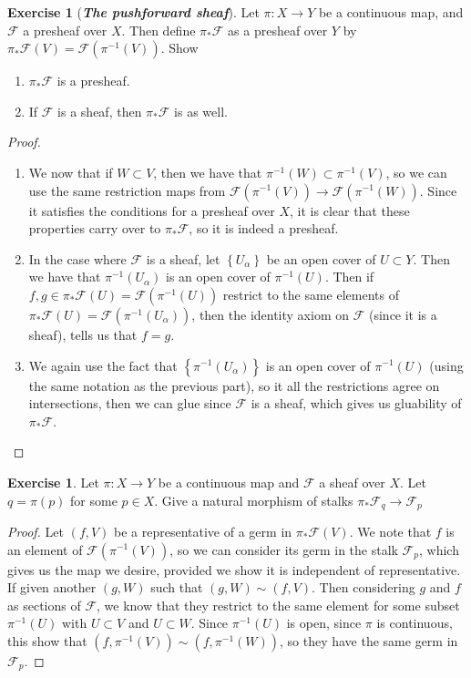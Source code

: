 \documentclass[psamsfonts]{amsart}
\theoremstyle{definition}
\newtheorem{exer}[thm]{Exercise}
\theoremstyle{remark}
\newcommand{\ib}[1]{\textbf{\textit{#1}}}
\newcommand{\inv}{^{-1}}
\newcommand{\set}[1]{\left\lbrace #1 \right\rbrace}
\newcommand{\enumbreak}{\ \\ \vspace{-\baselineskip}}
\begin{document}
%
\begin{exer}[\ib{The pushforward sheaf}]
Let $\pi : X \to Y$ be a continuous map, and $\mathscr{F}$ a presheaf over $X$. Then define $\pi_*\mathscr{F}$ as a presheaf over $Y$ by $\pi_*\mathscr{F}(V) = \mathscr{F}(\pi\inv(V))$. Show 
\begin{enumerate}
\item $\pi_*\mathscr{F}$ is a presheaf.
\item If $\mathscr{F}$ is a sheaf, then $\pi_*\mathscr{F}$ is as well.
\end{enumerate}
\end{exer}
%
\begin{proof} \enumbreak
\begin{enumerate}
\item We now that if $W \subset V$, then we have that $\pi\inv(W) \subset \pi\inv(V)$, so we can use the same restriction maps from $\mathscr{F}(\pi\inv(V)) \to \mathscr{F}(\pi\inv(W))$. Since it satisfies the conditions for a presheaf over $X$, it is clear that these properties carry over to $\pi_*\mathscr{F}$, so it is indeed a presheaf.
\item In the case where $\mathscr{F}$ is a sheaf, let $\set{U_\alpha}$ be an open cover of $U \subset Y$. Then we have that $\pi\inv(U_\alpha)$ is an open cover of $\pi\inv(U)$. Then if $f,g \in \pi_*\mathscr{F}(U) = \mathscr{F}(\pi\inv(U))$ restrict to the same elements of $\pi_*\mathscr{F}(U) = \mathscr{F}(\pi\inv(U_\alpha))$, then the identity axiom on $\mathscr{F}$ (since it is a sheaf), tells us that $f = g$.
\item We again use the fact that $\set{\pi\inv(U_\alpha)}$ is an open cover of $\pi\inv(U)$ (using the same notation as the previous part), so it all the restrictions agree on intersections, then we can glue since $\mathscr{F}$ is a sheaf, which gives us gluability of $\pi_*\mathscr{F}$.
\end{enumerate}
\end{proof}
%
\begin{exer}
Let $\pi : X \to Y$ be a continuous map and $\mathscr{F}$ a sheaf over $X$. Let $q = \pi(p)$ for some $p \in X$. Give a natural morphism of stalks $\pi_*\mathscr{F}_q \to \mathscr{F}_p $
\end{exer}
%
\begin{proof}
Let $(f,V)$ be a representative of a germ in $\pi_*\mathscr{F}(V)$. We note that $f$ is an element of $\mathscr{F}(\pi\inv(V))$, so we can consider its germ in the stalk $\mathscr{F}_p$, which gives us the map we desire, provided we show it is independent of representative. If given another $(g,W)$ such that $(g,W) \sim (f,V)$. Then considering $g$ and $f$ as sections of $\mathscr{F}$, we know that they restrict to the same element for some subset $\pi\inv(U)$ with $U \subset V$ and $U \subset W$. Since $\pi\inv(U)$ is open, since $\pi$ is continuous, this show that $(f,\pi\inv(V)) \sim (f,\pi\inv(W))$, so they have the same germ in $\mathscr{F}_p$.
\end{proof}
\end{document}
